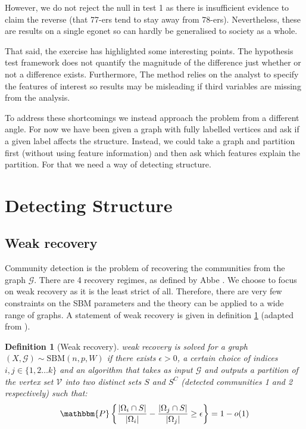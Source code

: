 \documentclass[11pt]{article}
\newcommand{\Gcal}{\mathcal{G}}
\newcommand{\Vcal}{\mathcal{V}}
\newcommand{\prob}{\mathbbm{P}}
\newtheorem{definition}{Definition}[section]
\begin{document}
\begin{multicols*}{2}
However, we do not reject the null in test 1 as there is insufficient evidence to claim the reverse (that 77-ers tend to stay away from 78-ers). Nevertheless, these are results on a single egonet so can hardly be generalised to society as a whole.

That said, the exercise has highlighted some interesting points. The hypothesis test framework does not quantify the magnitude of the difference just whether or not a difference exists. Furthermore, The method relies on the analyst to specify the features of interest so results may be misleading if third variables are missing from the analysis.

To address these shortcomings we instead approach the problem from a different angle. For now we have been given a graph with fully labelled vertices and ask if a given label affects the structure. Instead, we could take a graph and partition first (without using feature information) and then ask which features explain the partition. For that we need a way of detecting structure.

\section{Detecting Structure}
\subsection{Weak recovery}

Community detection is the problem of recovering the communities from the graph $\Gcal$. There are 4 recovery regimes, as defined by Abbe \cite{Abbe}. We choose to focus on weak recovery as it is the least strict of all. Therefore, there are very few constraints on the SBM parameters and the theory can be applied to a wide range of graphs. A statement of weak recovery is given in definition \ref{defn:weak-recovery} (adapted from \cite{Abbe}).

\begin{definition}[Weak recovery]
	\label{defn:weak-recovery}
	weak recovery is solved for a graph  $(X, \Gcal) \sim \textrm{SBM}(n, p, W)$ if there exists $\epsilon > 0$, a certain choice of indices $i, j \in \{1, 2 \dots k\}$ and an algorithm that takes as input $\Gcal$ and outputs a partition of the vertex set $\Vcal$ into two distinct sets $S$ and $S^C$ (detected communities 1 and 2 respectively) such that:
	\begin{equation*}
		\prob \left\{ \frac{|\Omega_i \cap S|}{|\Omega_i|} - \frac{|\Omega_j \cap S|}{|\Omega_j|} \geq \epsilon \right\} = 1 - o(1)
	\end{equation*}


\end{definition}
\end{multicols*}
\end{document}
